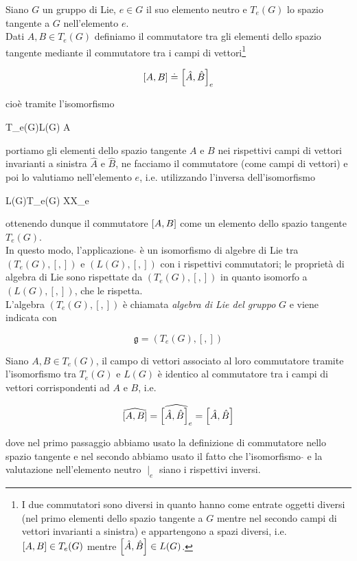 Siano $ G $ un gruppo di Lie, $ e \in G $ il suo elemento neutro e $ T_{e}(G) $ lo spazio tangente a $ G $ nell'elemento $ e $.\\
Dati $ A,B \in T_{e}(G) $ definiamo il commutatore tra gli elementi dello spazio tangente mediante il commutatore tra i campi di vettori\footnote{%
	I due commutatori sono diversi in quanto hanno come entrate oggetti diversi (nel primo elementi dello spazio tangente a $ G $ mentre nel secondo campi di vettori invarianti a sinistra) e appartengono a spazi diversi, i.e. $ \comm{A}{B} \in T_{e}(G) $ mentre $ \comm{\hat{A}}{\hat{B}} \in L(G) $.%
}

\begin{equation}
	\comm{A}{B} \doteq \comm{\hat{A}}{\hat{B}}_{e}
\end{equation}

cioè tramite l'isomorfismo

\map{\hat{}}%
	{T_{e}(G)}{L(G)}%
	{A}{}

portiamo gli elementi dello spazio tangente $ A $ e $ B $ nei rispettivi campi di vettori invarianti a sinistra $ \hat{A} $ e $ \hat{B} $, ne facciamo il commutatore (come campi di vettori) e poi lo valutiamo nell'elemento $ e $, i.e. utilizzando l'inversa dell'isomorfismo

%
	{L(G)}{T_{e}(G)}%
	{X}{X_{e}}

ottenendo dunque il commutatore $ \comm{A}{B} $ come un elemento dello spazio tangente $ T_{e}(G) $.\\
In questo modo, l'applicazione $ \hat{} $ è un isomorfismo di algebre di Lie tra $ (T_{e}(G),[,]) $ e $ (L(G),[,]) $ con i rispettivi commutatori; le proprietà di algebra di Lie sono rispettate da $ (T_{e}(G),[,]) $ in quanto isomorfo a $ (L(G),[,]) $, che le rispetta.\\
L'algebra $ (T_{e}(G),[,]) $ è chiamata \textit{algebra di Lie del gruppo} $ G $ e viene indicata con

\begin{equation}
	\mathfrak{g} = (T_{e}(G),[,])
\end{equation}

\begin{remark}
	Siano $ A,B \in T_{e}(G) $, il campo di vettori associato al loro commutatore tramite l'isomorfismo tra $ T_{e}(G) $ e $ L(G) $ è identico al commutatore tra i campi di vettori corrispondenti ad $ A $ e $ B $, i.e.
	
	\begin{equation}
		\widehat{[A,B]} = \widehat{\comm{\hat{A}}{\hat{B}}_{e}} = \comm{\hat{A}}{\hat{B}}
	\end{equation}

	dove nel primo passaggio abbiamo usato la definizione di commutatore nello spazio tangente e nel secondo abbiamo usato il fatto che l'isomorfismo $ \hat{} $ e la valutazione nell'elemento neutro $ \mid_{e} $ siano i rispettivi inversi.
\end{remark}